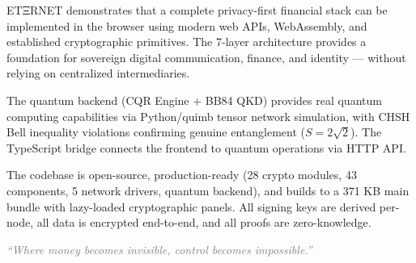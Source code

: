 \documentclass[11pt,a4paper]{article}
\begin{document}
ETΞRNET demonstrates that a complete privacy-first financial stack can be implemented in the browser using modern web APIs, WebAssembly, and established cryptographic primitives. The 7-layer architecture provides a foundation for sovereign digital communication, finance, and identity --- without relying on centralized intermediaries.

The quantum backend (CQR Engine + BB84 QKD) provides real quantum computing capabilities via Python/quimb tensor network simulation, with CHSH Bell inequality violations confirming genuine entanglement ($S = 2\sqrt{2}$). The TypeScript bridge connects the frontend to quantum operations via HTTP API.

The codebase is open-source, production-ready (28 crypto modules, 43 components, 5 network drivers, quantum backend), and builds to a 371 KB main bundle with lazy-loaded cryptographic panels. All signing keys are derived per-node, all data is encrypted end-to-end, and all proofs are zero-knowledge.

\vspace{1cm}
\begin{center}
\textcolor{gray}{\textit{``Where money becomes invisible, control becomes impossible.''}}
\end{center}
\end{document}
